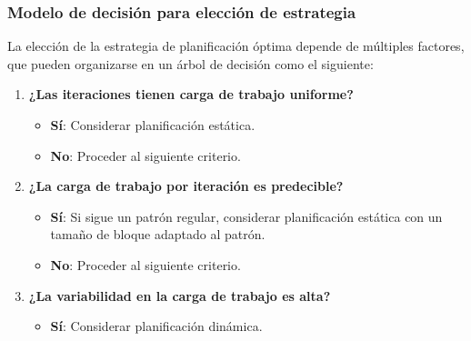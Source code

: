         \subsubsection{Modelo de decisión para elección de estrategia}
        
            La elección de la estrategia de planificación óptima depende de múltiples factores, que pueden organizarse en un árbol de decisión como el siguiente:
        
            \begin{enumerate}
            
                \item \textbf{¿Las iteraciones tienen carga de trabajo uniforme?}
                
                    \begin{itemize}

                        \item \textbf{Sí}: Considerar planificación estática.
                        
                        \item \textbf{No}: Proceder al siguiente criterio.
                        
                    \end{itemize}
                    
                \item \textbf{¿La carga de trabajo por iteración es predecible?}
                
                    \begin{itemize}

                        \item \textbf{Sí}: Si sigue un patrón regular, considerar planificación estática con un tamaño de bloque adaptado al patrón.
                        
                        \item \textbf{No}: Proceder al siguiente criterio.
                        
                    \end{itemize}
                
                \item \textbf{¿La variabilidad en la carga de trabajo es alta?}
                
                    \begin{itemize}
                    
                        \item \textbf{Sí}: Considerar planificación dinámica.
                        

\end{itemize}
\end{enumerate}
